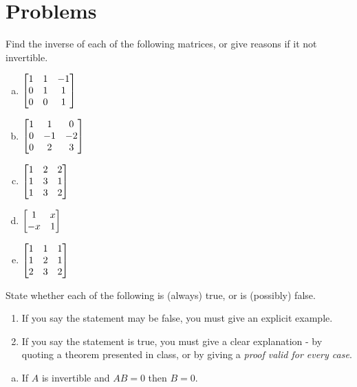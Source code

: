 \section*{Problems}


\begin{prob} \label{prob18.1} Find the inverse of each of the following matrices, or give reasons if it not invertible.
\medskip
\begin{enumerate}[a)]
\item $\bmatrix 1&1&-1\\
0&1&1\\
0&0&1\endbmatrix$
\medskip
\item\sov $\bmatrix1&1&0\\
0&-1&-2\\
0&2&3\endbmatrix$
\medskip
\item $\bmatrix 1 & 2 & 2\\ 1 & 3 & 1\\ 1 & 3 & 2\endbmatrix$
\medskip
%
\item\sov  $\bmatrix  1&x\\ -x&1\endbmatrix$
\medskip
\item 
\medskip $\bmatrix
1&1&1\\ 1&2&1\\2&3&2 \endbmatrix$
%
\end{enumerate}

 
\end{prob} \begin{prob} \label{prob18.2} State whether each of the following is (always) true,
or is (possibly) false.     
   \smallskip    
\begin{enumerate}[$\bullet$]
\item If you say the statement may be false, you must give an explicit example.   
\item If you say the statement is true, you must give a clear explanation -   by quoting a theorem presented in class, or by giving a {\it proof valid for every  case}. 
\end{enumerate}
\begin{enumerate}[a)]
\medskip
\item If $A$ is invertible and $AB=0$ then $B=0$.
\medskip
%


\end{enumerate}
\end{prob}
